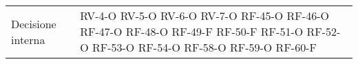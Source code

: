 \begin{longtable}{ 
		>{}p{} 
		>{}p{} }
Decisione interna &
	RV-4-O	\newline
	RV-5-O	\newline
	RV-6-O	\newline
	RV-7-O	\newline
	RF-45-O \newline
	RF-46-O \newline
	RF-47-O \newline
	RF-48-O \newline
	RF-49-F \newline
	RF-50-F \newline
	RF-51-O \newline
	RF-52-O \newline
	RF-53-O \newline
	RF-54-O \newline
	RF-58-O \newline
	RF-59-O \newline
	RF-60-F \tabularnewline
	

\end{longtable}
